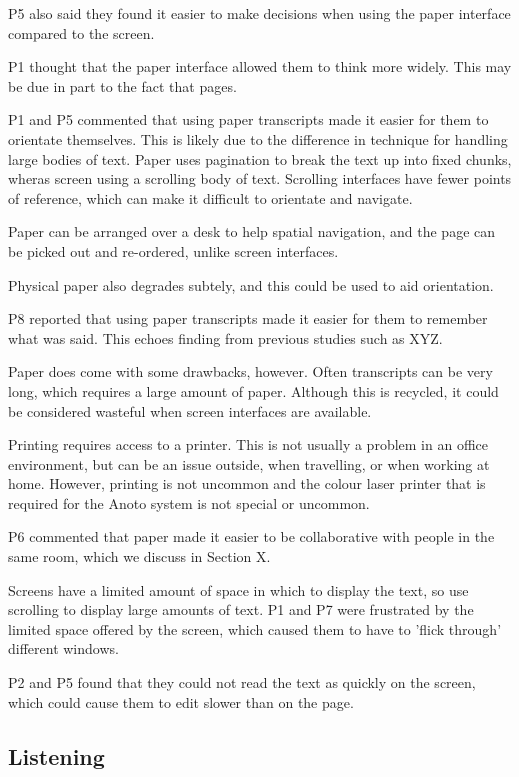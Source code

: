 P5 also said they found it easier to make decisions when using the paper interface compared to the screen.

P1 thought that the paper interface allowed them to think more widely. This may be due in part to the fact that pages.

P1 and P5 commented that using paper transcripts made it easier for them to orientate themselves. This is likely due to
the difference in technique for handling large bodies of text. Paper uses pagination to break the text up into fixed
chunks, wheras screen using a scrolling body of text. Scrolling interfaces have fewer points of reference, which can
make it difficult to orientate and navigate.

Paper can be arranged over a desk to help spatial navigation, and the page can be picked out and re-ordered, unlike
screen interfaces.

Physical paper also degrades subtely, and this could be used to aid orientation.

P8 reported that using paper transcripts made it easier for them to remember what was said. This echoes finding from
previous studies such as XYZ.

Paper does come with some drawbacks, however. Often transcripts can be very long, which requires a large amount of
paper. Although this is recycled, it could be considered wasteful when screen interfaces are available.

Printing requires access to a printer. This is not usually a problem in an office environment, but can be an issue
outside, when travelling, or when working at home. However, printing is not uncommon and the colour laser printer that
is required for the Anoto system is not special or uncommon.

P6 commented that paper made it easier to be collaborative with people in the same room, which we discuss in Section X.

Screens have a limited amount of space in which to display the text, so use scrolling to display large amounts of text.
P1 and P7 were frustrated by the limited space offered by the screen, which caused them to have to 'flick through'
different windows.

P2 and P5 found that they could not read the text as quickly on the screen, which could cause them to edit slower than
on the page.

\subsection{Listening}

